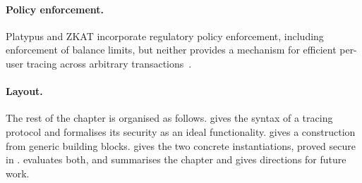 \paragraph{Policy enforcement.} Platypus and ZKAT incorporate regulatory policy enforcement, including
enforcement of balance limits, but neither provides a mechanism for efficient
per-user tracing across arbitrary
transactions~\cite{CCS:WKDC22,androulaki2020auditable}.

\paragraph{Layout.} The rest of the chapter is organised as follows.  gives the syntax of a tracing
protocol and formalises its security as an ideal functionality.
 gives a construction from generic building blocks.
 gives the two concrete instantiations, proved
secure in .   evaluates both,
and  summarises the chapter and gives directions for
future work.
